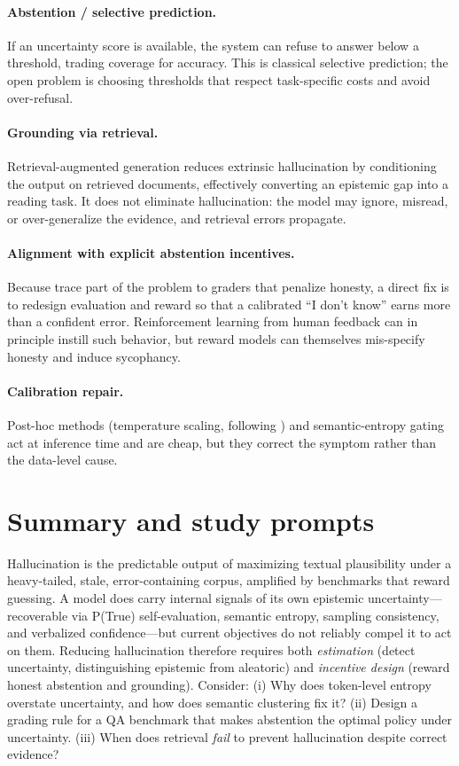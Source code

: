 \documentclass[11pt]{article}
\begin{document}
\paragraph{Abstention / selective prediction.} If an uncertainty score is available, the system can refuse to answer below a threshold, trading coverage for accuracy. This is classical selective prediction; the open problem is choosing thresholds that respect task-specific costs and avoid over-refusal.

\paragraph{Grounding via retrieval.} Retrieval-augmented generation \citep{lewis2020rag} reduces extrinsic hallucination by conditioning the output on retrieved documents, effectively converting an epistemic gap into a reading task. It does not eliminate hallucination: the model may ignore, misread, or over-generalize the evidence, and retrieval errors propagate.

\paragraph{Alignment with explicit abstention incentives.} Because \citet{kalai2025hallucinate} trace part of the problem to graders that penalize honesty, a direct fix is to redesign evaluation and reward so that a calibrated ``I don't know'' earns more than a confident error. Reinforcement learning from human feedback \citep{ouyang2022instructgpt} can in principle instill such behavior, but reward models can themselves mis-specify honesty and induce sycophancy.

\paragraph{Calibration repair.} Post-hoc methods (temperature scaling, following \citet{guo2017calibration}) and semantic-entropy gating act at inference time and are cheap, but they correct the symptom rather than the data-level cause.

\section{Summary and study prompts}
Hallucination is the predictable output of maximizing textual plausibility under a heavy-tailed, stale, error-containing corpus, amplified by benchmarks that reward guessing. A model does carry internal signals of its own epistemic uncertainty---recoverable via P(True) self-evaluation, semantic entropy, sampling consistency, and verbalized confidence---but current objectives do not reliably compel it to act on them. Reducing hallucination therefore requires both \emph{estimation} (detect uncertainty, distinguishing epistemic from aleatoric) and \emph{incentive design} (reward honest abstention and grounding). Consider: (i) Why does token-level entropy overstate uncertainty, and how does semantic clustering fix it? (ii) Design a grading rule for a QA benchmark that makes abstention the optimal policy under uncertainty. (iii) When does retrieval \emph{fail} to prevent hallucination despite correct evidence?



\end{document}
